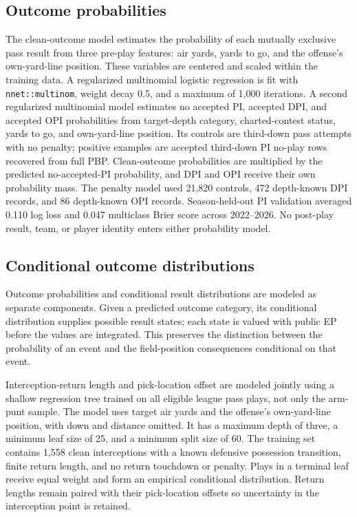 \documentclass[11pt]{article}
\begin{document}
\subsection{Outcome probabilities}

The clean-outcome model estimates the probability of each mutually exclusive pass result from three pre-play features: air yards, yards to go, and the offense's own-yard-line position. These variables are centered and scaled within the training data. A regularized multinomial logistic regression is fit with \texttt{nnet::multinom}, weight decay 0.5, and a maximum of 1,000 iterations. A second regularized multinomial model estimates no accepted PI, accepted DPI, and accepted OPI probabilities from target-depth category, charted-contest status, yards to go, and own-yard-line position. Its controls are third-down pass attempts with no penalty; positive examples are accepted third-down PI no-play rows recovered from full PBP. Clean-outcome probabilities are multiplied by the predicted no-accepted-PI probability, and DPI and OPI receive their own probability mass. The penalty model used 21,820 controls, 472 depth-known DPI records, and 86 depth-known OPI records. Season-held-out PI validation averaged 0.110 log loss and 0.047 multiclass Brier score across 2022--2026. No post-play result, team, or player identity enters either probability model.

\subsection{Conditional outcome distributions}

Outcome probabilities and conditional result distributions are modeled as separate components. Given a predicted outcome category, its conditional distribution supplies possible result states; each state is valued with public EP before the values are integrated. This preserves the distinction between the probability of an event and the field-position consequences conditional on that event.

Interception-return length and pick-location offset are modeled jointly using a shallow regression tree trained on all eligible league pass plays, not only the arm-punt sample. The model uses target air yards and the offense's own-yard-line position, with down and distance omitted. It has a maximum depth of three, a minimum leaf size of 25, and a minimum split size of 60. The training set contains 1,558 clean interceptions with a known defensive possession transition, finite return length, and no return touchdown or penalty. Plays in a terminal leaf receive equal weight and form an empirical conditional distribution. Return lengths remain paired with their pick-location offsets so uncertainty in the interception point is retained.
\end{document}
